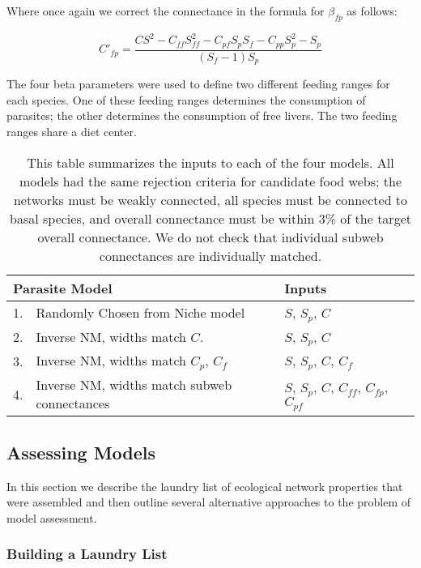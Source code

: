 \documentclass[/home/nkappler/Research/Dissertation/
 dissertation.tex]{subfiles}
\begin{document}
\begin{bibunit}
Where once again we correct the connectance in the formula for $\beta_{f\!p}$ as
follows:

\begin{equation}
    C'_{f\!p} = \frac{CS^2 - C^{ }_{f\!f}S_{f\!f}^2 -C_{p\!f}S_pS_f
        -C^{ }_{pp}S_p^2 -
    S_p}{(S_f-1)S_p}\label{eq:CfpAdj}
\end{equation}

The four beta parameters were used to define two different feeding ranges for
each species. One of these feeding ranges determines the consumption of
parasites; the other determines the consumption of free livers. The two feeding
ranges share a diet center. 

\begin{table}
    \begin{tabular}{r l l l}
        \toprule
        \multicolumn{2}{l}{Parasite Model}  & Inputs \\
        \midrule
        1. & Randomly Chosen from Niche model&$S$, $S_p$, $C$\\
        2. &Inverse NM, widths match $C$.& $S$, $S_p$,
        $C$\\
        3. &Inverse NM, widths match $C_p$, $C_f$& $S$, $S_p$,
        $C$, $C_f$\\
        4. &Inverse NM, widths match subweb connectances& $S$, $S_p$,
        $C$, $C_{f\!f}$, $C_{f\!p}$, $C_{p\!f}$\\
        \bottomrule
    \end{tabular}   
    \caption[Summary of food web models tested]{This table summarizes the inputs to each of the four models. All
    models had the same rejection criteria for candidate food webs; the
    networks  must be weakly connected, all species must be connected to basal
    species, and overall connectance must be within 3\% of the target overall
    connectance. We do not check that individual subweb connectances are
    individually matched.\label{tab:invNMSummary}}
\end{table}


\subsection{Assessing Models}

In this section we describe the laundry list of ecological network properties
that were assembled and then outline several alternative approaches to the
problem of model assessment. 

\subsubsection{Building a Laundry List}


\end{bibunit}
\end{document}
